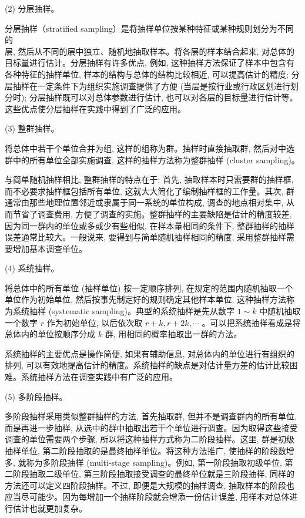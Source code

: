 \documentclass[10pt]{article}
\begin{document}
\begin{CJK*}{UTF8}{bsmi}
(2) 分层抽样。

分层抽样（stratified sampling）是将抽样单位按某种特征或某种规则划分为不同的\\
层, 然后从不同的层中独立、随机地抽取样本。将各层的样本结合起来, 对总体的目标量进行估计。分层抽样有许多优点, 例如, 这种抽样方法保证了样本中包含有各种特征的抽样单位, 样本的结构与总体的结构比较相近, 可以提高估计的精度; 分层抽样在一定条件下为组织实施调查提供了方便 (当层是按行业或行政区划进行划分时); 分层抽样既可以对总体参数进行估计, 也可以对各层的目标量进行估计等。这些优点使分层抽样在实践中得到了广泛的应用。

(3) 整群抽样。

将总体中若干个单位合并为组, 这样的组称为群。抽样时直接抽取群, 然后对中选群中的所有单位全部实施调查, 这样的抽样方法称为整群抽样 (cluster sampling)。

与简单随机抽样相比, 整群抽样的特点在于: 首先, 抽取样本时只需要群的抽样框,而不必要求抽样框包括所有单位, 这就大大简化了编制抽样框的工作量。其次, 群通常由那些地理位置邻近或隶属于同一系统的单位构成, 调查的地点相对集中, 从而节省了调查费用, 方便了调查的实施。整群抽样的主要缺陷是估计的精度较差, 因为同一群内的单位或多或少有些相似, 在样本量相同的条件下, 整群抽样的抽样误差通常比较大。一般说来, 要得到与简单随机抽样相同的精度, 采用整群抽样需要增加基本调查单位。

(4) 系统抽样。

将总体中的所有单位 (抽样单位) 按一定顺序排列, 在规定的范围内随机抽取一个单位作为初始单位, 然后按事先制定好的规则确定其他样本单位, 这种抽样方法称为系统抽样 (systematic sampling)。典型的系统抽样是先从数字 $1 \sim k$ 中随机抽取一个数字 $r$ 作为初始单位, 以后依次取 $r+k, r+2 k, \cdots$ 。可以把系统抽样看成是将总体内的单位按顺序分成 $k$ 群, 用相同的概率抽取出一群的方法。

系统抽样的主要优点是操作简便, 如果有辅助信息, 对总体内的单位进行有组织的排列, 可以有效地提高估计的精度。系统抽样的缺点是对估计量方差的估计比较困难。系统抽样方法在调查实践中有广泛的应用。

(5) 多阶段抽样。

多阶段抽样采用类似整群抽样的方法, 首先抽取群, 但并不是调查群内的所有单位,而是再进一步抽样, 从选中的群中抽取出若干个单位进行调查。因为取得这些接受调查的单位需要两个步骤, 所以将这种抽样方式称为二阶段抽样。这里, 群是初级抽样单位, 第二阶段抽取的是最终抽样单位。将这种方法推广, 使抽样的阶段数增多, 就称为多阶段抽样 (multi-stage sampling)。例如, 第一阶段抽取初级单位, 第二阶段抽取二级单位, 第三阶段抽取接受调查的最终单位就是三阶段抽样, 同样的方法还可以定义四阶段抽样。不过, 即便是大规模的抽样调查, 抽取样本的阶段也应当尽可能少。因为每增加一个抽样阶段就会增添一份估计误差, 用样本对总体进行估计也就更加复杂。


\end{CJK*}
\end{document}

